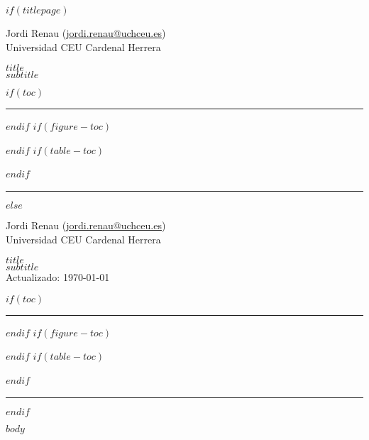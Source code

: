 \documentclass[$fontsize$,a4paper,twoside,onecolumn]{scrartcl}
\author{$author$}
\subtitle{$subtitle$}
\date{$date$}
\newcommand{\mititulo}{ $title$ }
\newcommand{\misubtitulo}{ $subtitle$ }
\begin{document}
	\renewcommand{\tablename}{Tabla}
	
$if(titlepage)$
	\begin{titlepage}
		\begin{flushright}
			\large
			Jordi Renau (\href{mailto:jordi.renau@uchceu.es}{jordi.renau@uchceu.es}) \\
			Universidad CEU Cardenal Herrera %

		\Huge 
		\mititulo \\[0.5cm]
		\huge
		\misubtitulo \\[1.5cm]
	\end{flushright}
	\small
	$if(toc)$
	\hrule
	\renewcommand{\contentsname}{Contenidos \small (\textit{Actualizado}: \today)}
	\tableofcontents 
	$endif$
	$if(figure-toc)$
	\renewcommand{\listfigurename}{Lista de figuras}
	\listoffigures
	$endif$
	$if(table-toc)$
	\renewcommand{\listtablename}{Lista de tablas}
	\listoftables
	\normalsize
	$endif$
	~
	\hrule
	
	\end{titlepage}

$else$
		\begin{flushright}
				\thispagestyle{empty}
				\large
				Jordi Renau (\href{mailto:jordi.renau@uchceu.es}{jordi.renau@uchceu.es}) \\
				Universidad CEU Cardenal Herrera %
			
				\Huge 
				\mititulo \\[0.5cm]
				\huge
				\misubtitulo \\[0.5cm]
				\small Actualizado: \today
	\end{flushright}
	$if(toc)$
		\small
		\hrule
		\renewcommand{\contentsname}{Contenidos}
		\tableofcontents 
		$endif$
		$if(figure-toc)$
		\renewcommand{\listfigurename}{Lista de figuras}
		\listoffigures
		$endif$
		$if(table-toc)$
		\renewcommand{\listtablename}{Lista de tablas}
		\listoftables
		\normalsize
		$endif$
		~
		\hrule
$endif$




$body$
\end{document}
